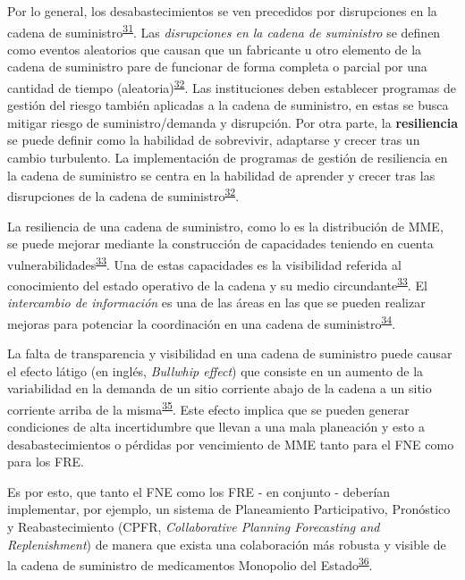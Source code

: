\documentclass[
  oneside]{book}
\begin{document}
Por lo general, los desabastecimientos se ven precedidos por disrupciones en la cadena de suministro\textsuperscript{\protect\hyperlink{ref-FDA2014}{31}}. Las \emph{disrupciones en la cadena de suministro} se definen como eventos aleatorios que causan que un fabricante u otro elemento de la cadena de suministro pare de funcionar de forma completa o parcial por una cantidad de tiempo (aleatoria)\textsuperscript{\protect\hyperlink{ref-Barbosa-Povoa2019}{32}}. Las instituciones deben establecer programas de gestión del riesgo también aplicadas a la cadena de suministro, en estas se busca mitigar riesgo de suministro/demanda y disrupción. Por otra parte, la \textbf{resiliencia} se puede definir como la habilidad de sobrevivir, adaptarse y crecer tras un cambio turbulento. La implementación de programas de gestión de resiliencia en la cadena de suministro se centra en la habilidad de aprender y crecer tras las disrupciones de la cadena de suministro\textsuperscript{\protect\hyperlink{ref-Barbosa-Povoa2019}{32}}.

La resiliencia de una cadena de suministro, como lo es la distribución de MME, se puede mejorar mediante la construcción de capacidades teniendo en cuenta vulnerabilidades\textsuperscript{\protect\hyperlink{ref-Pettit2013}{33}}. Una de estas capacidades es la visibilidad referida al conocimiento del estado operativo de la cadena y su medio circundante\textsuperscript{\protect\hyperlink{ref-Pettit2013}{33}}. El \emph{intercambio de información} es una de las áreas en las que se pueden realizar mejoras para potenciar la coordinación en una cadena de suministro\textsuperscript{\protect\hyperlink{ref-Silver2017}{34}}.

La falta de transparencia y visibilidad en una cadena de suministro puede causar el efecto látigo (en inglés, \emph{Bullwhip effect}) que consiste en un aumento de la variabilidad en la demanda de un sitio corriente abajo de la cadena a un sitio corriente arriba de la misma\textsuperscript{\protect\hyperlink{ref-Cachon2007}{35}}. Este efecto implica que se pueden generar condiciones de alta incertidumbre que llevan a una mala planeación y esto a desabastecimientos o pérdidas por vencimiento de MME tanto para el FNE como para los FRE.

Es por esto, que tanto el FNE como los FRE - en conjunto - deberían implementar, por ejemplo, un sistema de Planeamiento Participativo, Pronóstico y Reabastecimiento (CPFR, \emph{Collaborative Planning Forecasting and Replenishment}) de manera que exista una colaboración más robusta y visible de la cadena de suministro de medicamentos Monopolio del Estado\textsuperscript{\protect\hyperlink{ref-Hollmann2015}{36}}.
\end{document}
